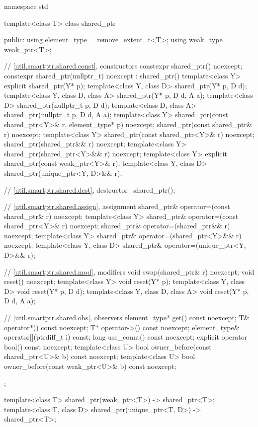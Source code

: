 \begin{codeblock}
namespace std {
  template<class T> class shared_ptr {
  public:
    using element_type = remove_extent_t<T>;
    using weak_type    = weak_ptr<T>;

    // \ref{util.smartptr.shared.const}, constructors
    constexpr shared_ptr() noexcept;
    constexpr shared_ptr(nullptr_t) noexcept : shared_ptr() { }
    template<class Y>
      explicit shared_ptr(Y* p);
    template<class Y, class D>
      shared_ptr(Y* p, D d);
    template<class Y, class D, class A>
      shared_ptr(Y* p, D d, A a);
    template<class D>
      shared_ptr(nullptr_t p, D d);
    template<class D, class A>
      shared_ptr(nullptr_t p, D d, A a);
    template<class Y>
      shared_ptr(const shared_ptr<Y>& r, element_type* p) noexcept;
    shared_ptr(const shared_ptr& r) noexcept;
    template<class Y>
      shared_ptr(const shared_ptr<Y>& r) noexcept;
    shared_ptr(shared_ptr&& r) noexcept;
    template<class Y>
      shared_ptr(shared_ptr<Y>&& r) noexcept;
    template<class Y>
      explicit shared_ptr(const weak_ptr<Y>& r);
    template<class Y, class D>
      shared_ptr(unique_ptr<Y, D>&& r);

    // \ref{util.smartptr.shared.dest}, destructor
    ~shared_ptr();

    // \ref{util.smartptr.shared.assign}, assignment
    shared_ptr& operator=(const shared_ptr& r) noexcept;
    template<class Y>
      shared_ptr& operator=(const shared_ptr<Y>& r) noexcept;
    shared_ptr& operator=(shared_ptr&& r) noexcept;
    template<class Y>
      shared_ptr& operator=(shared_ptr<Y>&& r) noexcept;
    template<class Y, class D>
      shared_ptr& operator=(unique_ptr<Y, D>&& r);

    // \ref{util.smartptr.shared.mod}, modifiers
    void swap(shared_ptr& r) noexcept;
    void reset() noexcept;
    template<class Y>
      void reset(Y* p);
    template<class Y, class D>
      void reset(Y* p, D d);
    template<class Y, class D, class A>
      void reset(Y* p, D d, A a);

    // \ref{util.smartptr.shared.obs}, observers
    element_type* get() const noexcept;
    T& operator*() const noexcept;
    T* operator->() const noexcept;
    element_type& operator[](ptrdiff_t i) const;
    long use_count() const noexcept;
    explicit operator bool() const noexcept;
    template<class U>
      bool owner_before(const shared_ptr<U>& b) const noexcept;
    template<class U>
      bool owner_before(const weak_ptr<U>& b) const noexcept;
  };

  template<class T>
    shared_ptr(weak_ptr<T>) -> shared_ptr<T>;
  template<class T, class D>
    shared_ptr(unique_ptr<T, D>) -> shared_ptr<T>;
}
\end{codeblock}

